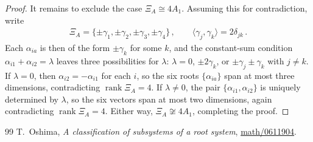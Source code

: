 \documentclass[10pt,a4paper]{amsart}
\DeclareMathOperator{\rank}{rank}
\begin{document}
\begin{proof}
    It remains to exclude the case $ \Xi_A \cong 4A_1 $. Assuming this for
    contradiction, write
    \begin{align}
        \Xi_A = \{ \pm \gamma_1, \pm \gamma_2, \pm \gamma_3, \pm \gamma_4 \} \, ,
        \qquad \langle \gamma_j, \gamma_k \rangle = 2\delta_{jk} \, .
    \end{align}
    Each $ \alpha_{ia} $ is then of the form $ \pm \gamma_k $ for some $ k $, and the constant-sum condition $ \alpha_{i1}+\alpha_{i2}=\lambda $ leaves three possibilities for $ \lambda $: $ \lambda = 0 $, $ \pm 2\gamma_k $, or $ \pm\gamma_j \pm \gamma_k $ with $ j\neq k $. If $ \lambda = 0 $, then $ \alpha_{i2} = -\alpha_{i1} $ for each $ i $, so the six roots $ \{\alpha_{ia}\} $ span at most three dimensions, contradicting $ \rank\Xi_A = 4 $. If $ \lambda \neq 0 $, the pair $ \{\alpha_{i1}, \alpha_{i2}\} $ is uniquely determined by $ \lambda $, so the six vectors span at most two dimensions, again contradicting $ \rank\Xi_A = 4 $. Either way, $ \Xi_A \not\cong 4A_1 $, completing the proof.
\end{proof}

\begin{thebibliography}{99}
 T.~Oshima, \emph{{A classification of subsystems of a root system}}, \href{https://arxiv.org/abs/math/0611904}{{\ttfamily math/0611904}}.
\end{thebibliography}
\end{document}
